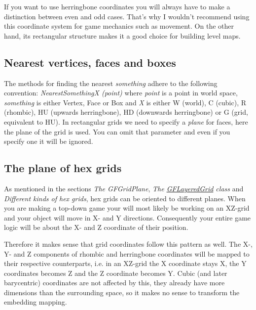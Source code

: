 If you want to use herringbone coordinates you will always have to make a distinction between even and odd cases. That's why I wouldn't recommend using this coordinate system for game mechanics such as movement. On the other hand, its rectangular structure makes it a good choice for building level maps.

\subsection*{Nearest vertices, faces and boxes }

The methods for finding the nearest {\itshape something} adhere to the following convention\+: {\itshape Nearest\+Something\+X (point)} where {\itshape point} is a point in world space, {\itshape something} is either {\ttfamily Vertex}, {\ttfamily Face} or {\ttfamily Box} and {\itshape X} is either {\ttfamily W} (world), {\ttfamily C} (cubic), {\ttfamily R} (rhombic), {\ttfamily H\+U} (upwards herringbone), {\ttfamily H\+D} (downwards herringbone) or {\ttfamily G} (grid, equivalent to {\ttfamily H\+U}). In rectangular grids we need to specify a {\itshape plane} for faces, here the plane of the grid is used. You can omit that parameter and even if you specify one it will be ignored.

\subsection*{The plane of hex grids }

As mentioned in the sections {\itshape The G\+F\+Grid\+Plane}, {\itshape The \hyperlink{class_g_f_layered_grid}{G\+F\+Layered\+Grid} class} and {\itshape Different kinds of hex grids}, hex grids can be oriented to different planes. When you are making a top-\/down game your will most likely be working on an X\+Z-\/grid and your object will move in X-\/ and Y directions. Consequently your entire game logic will be about the X-\/ and Z coordinate of their position.

Therefore it makes sense that grid coordinates follow this pattern as well. The X-\/, Y-\/ and Z components of rhombic and herringbone coordinates will be mapped to their respective counterparts, i.\+e. in an X\+Z-\/grid the X coordinate stays X, the Y coordinates becomes Z and the Z coordinate becomes Y. Cubic (and later barycentric) coordinates are not affected by this, they already have more dimensions than the surrounding space, so it makes no sense to transform the embedding mapping.

